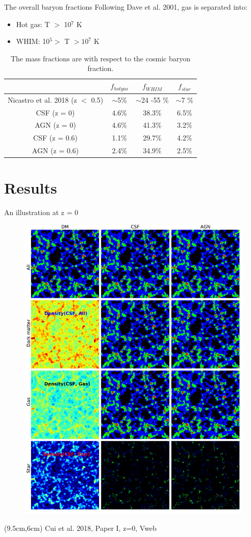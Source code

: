 \documentclass[aspectratio=43]{beamer}
\begin{document}
\begin{frame}{The overall baryon fractions}
    Following Dave et al. 2001, gas is separated into:
    \begin{itemize}
        \item[] Hot gas: T $>$ 10$^7$ K 
        \item[] WHIM: 10$^5 >$ T $> 10^7$ K 
    \end{itemize}
    
    \begin{table}[]
        \centering
        \begin{tabular}{c|c|c|c|}
            & $f_{hot gas}$ & $f_{WHIM}$ & $f_{star}$ \\
            \hline
           Nicastro et al. 2018 (z $<$ 0.5)  & $\sim$5\% & $\sim$24 -55 \% & $\sim$7 \% \\
           CSF (z = 0) & 4.6\% & 38.3\% & 6.5\% \\
           AGN (z = 0) & 4.6\% & 41.3\% & 3.2\% \\
           \hline
           CSF (z = 0.6) & 1.1\% & 29.7\% & 4.2\% \\
           AGN (z = 0.6) & 2.4\% & 34.9\% & 2.5\% \\
        \end{tabular}
        \caption{The mass fractions are with respect to the cosmic baryon fraction.}
        \label{tab:my_label}
    \end{table}
\end{frame}

\section{Results}
\begin{frame}{An illustration at z = 0}
  \begin{figure}
    \includegraphics[width=0.5\linewidth]{image_show_V}
  \end{figure}
  \begin{textblock*}{3cm}(9.5cm,6cm)
    {Cui et al. 2018, Paper I, z=0, Vweb}
  \end{textblock*}
\end{frame}
\end{document}
